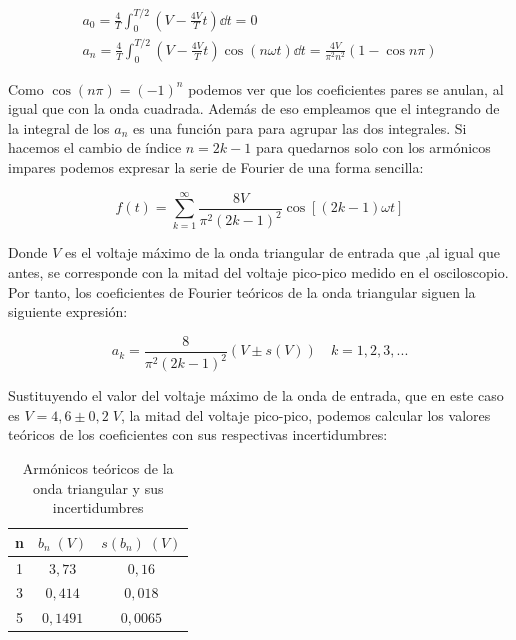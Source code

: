 \documentclass[a4paper,12pt,titlepage]{article}
\begin{document}
\begin{equation}
    \begin{gathered}
        a_0 = \frac{4}{T} \int_0^{T/2} \left( V-\frac{4V}{T} t \right) \dd t = 0 \\
        a_n = \frac{4}{T} \int_0^{T/2} \left( V-\frac{4V}{T} t \right) \cos (n\omega t) \dd t = \frac{4V}{\pi^2 n^2} (1-\cos n\pi)
    \end{gathered}
\end{equation}


Como $\cos(n\pi)=(-1)^n$ podemos ver que los coeficientes pares se anulan, al igual que con la onda cuadrada. Además de eso empleamos que el integrando de la integral de los $a_n$ es una función para para agrupar las dos integrales. Si hacemos el cambio de índice $n=2k-1$ para quedarnos solo con los armónicos impares podemos expresar la serie de Fourier de una forma sencilla:

\begin{equation}
    f(t) = \sum_{k=1}^{\infty} \frac{8V}{\pi^2(2k-1)^2} \cos [(2k-1)\omega t]
\end{equation}

Donde $V$ es el voltaje máximo de la onda triangular de entrada que ,al igual que antes, se corresponde con la mitad del voltaje pico-pico medido en el osciloscopio. Por tanto, los coeficientes de Fourier teóricos de la onda triangular siguen la siguiente expresión:

\begin{equation}
    a_k = \frac{8}{\pi^2 (2k-1)^2} (V\pm s(V)) \quad k=1,2,3,...
\end{equation}

Sustituyendo el valor del voltaje máximo de la onda de entrada, que en este caso es $V = 4,6\pm 0,2 \; V$, la mitad del voltaje pico-pico, podemos calcular los valores teóricos de los coeficientes con sus respectivas incertidumbres:

\begin{table}[h!]
\centering
\begin{tabular}{|c|c|c|}
\hline
n & $b_n \;(V)$ & $s(b_n) \;(V)$ \\ \hline
1 & $3,73$ & $0,16$ \\ \hline
3 & $0,414$ & $0,018$ \\ \hline
5 & $0,1491$ & $0,0065$ \\ \hline
\end{tabular}
\caption{Armónicos teóricos de la onda triangular y sus incertidumbres}
\label{tab:my-table}
\end{table}
\end{document}
